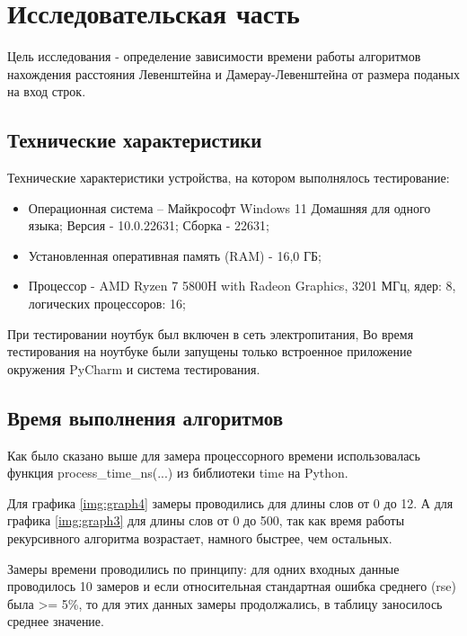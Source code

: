 \chapter{Исследовательская часть}

Цель исследования - определение зависимости времени работы алгоритмов нахождения расстояния Левенштейна и Дамерау-Левенштейна от размера поданых на вход строк.


\section{Технические характеристики}
Технические характеристики устройства, на котором выполнялось тестирование:
\begin{itemize}
	\item {Операционная система – Майкрософт Windows 11 Домашняя для одного языка; Версия - 10.0.22631; Сборка - 22631;}
	\item {Установленная оперативная память (RAM) - 16,0 ГБ;}
	\item {Процессор - AMD Ryzen 7 5800H with Radeon Graphics, 3201 МГц, ядер: 8, логических процессоров: 16;}
\end{itemize}

При тестировании ноутбук был включен в сеть электропитания, Во время тестирования на ноутбуке были запущены только встроенное приложение окружения PyCharm и система тестирования.

\section{Время выполнения алгоритмов}
Как было сказано выше для замера процессорного времени использовалась функция process\_time\_ns(...) из библиотеки time на Python.

Для графика \ref{img:graph4} замеры проводились для длины слов от 0 до 12. А для графика \ref{img:graph3} для длины слов от 0 до 500, так как время работы рекурсивного алгоритма возрастает, намного быстрее, чем остальных.

Замеры времени проводились по принципу: для одних входных данные проводилось 10 замеров и если относительная стандартная ошибка среднего (rse) была >= 5\%, то для этих данных замеры продолжались, в таблицу заносилось среднее значение.




